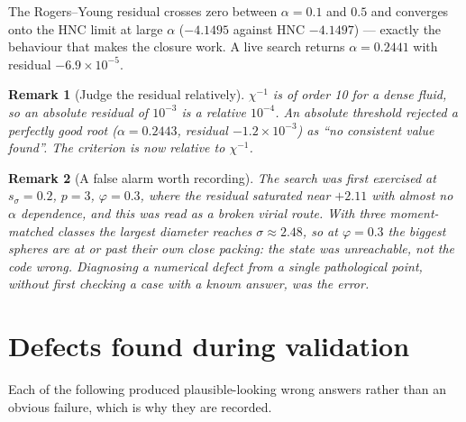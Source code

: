 \documentclass[11pt,a4paper]{article}
\newtheorem{remark}{Remark}
\begin{document}
The Rogers--Young residual crosses zero between $\alpha=0.1$ and $0.5$ and
converges onto the HNC limit at large $\alpha$ ($-4.1495$ against HNC
$-4.1497$) --- exactly the behaviour that makes the closure work. A live
search returns $\alpha=0.2441$ with residual $-6.9\times10^{-5}$.

\begin{remark}[Judge the residual relatively]
$\chi^{-1}$ is of order 10 for a dense fluid, so an absolute residual of
$10^{-3}$ is a \emph{relative} $10^{-4}$. An absolute threshold rejected a
perfectly good root ($\alpha=0.2443$, residual $-1.2\times10^{-3}$) as ``no
consistent value found''. The criterion is now relative to $\chi^{-1}$.
\end{remark}

\begin{remark}[A false alarm worth recording]
The search was first exercised at $s_\sigma=0.2$, $p=3$, $\varphi=0.3$, where
the residual saturated near $+2.11$ with almost no $\alpha$ dependence, and
this was read as a broken virial route. With three moment-matched classes the
largest diameter reaches $\sigma\approx2.48$, so at $\varphi=0.3$ the biggest
spheres are at or past their own close packing: the \emph{state} was
unreachable, not the code wrong. Diagnosing a numerical defect from a single
pathological point, without first checking a case with a known answer, was the
error.
\end{remark}

\section{Defects found during validation}
\label{sec:traps}

Each of the following produced plausible-looking wrong answers rather than an
obvious failure, which is why they are recorded.
\end{document}
